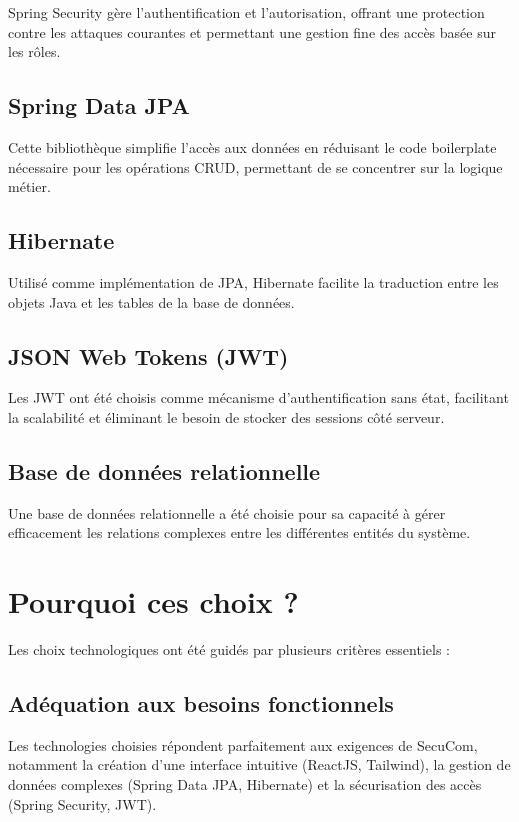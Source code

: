 \documentclass[12pt,a4paper]{report}
\begin{document}
Spring Security gère l'authentification et l'autorisation, offrant une protection contre les attaques courantes et permettant une gestion fine des accès basée sur les rôles.

\subsection{Spring Data JPA}

Cette bibliothèque simplifie l'accès aux données en réduisant le code boilerplate nécessaire pour les opérations CRUD, permettant de se concentrer sur la logique métier.

\subsection{Hibernate}

Utilisé comme implémentation de JPA, Hibernate facilite la traduction entre les objets Java et les tables de la base de données.

\subsection{JSON Web Tokens (JWT)}

Les JWT ont été choisis comme mécanisme d'authentification sans état, facilitant la scalabilité et éliminant le besoin de stocker des sessions côté serveur.

\subsection{Base de données relationnelle}

Une base de données relationnelle a été choisie pour sa capacité à gérer efficacement les relations complexes entre les différentes entités du système.

\section{Pourquoi ces choix ?}

Les choix technologiques ont été guidés par plusieurs critères essentiels :

\subsection{Adéquation aux besoins fonctionnels}

Les technologies choisies répondent parfaitement aux exigences de SecuCom, notamment la création d'une interface intuitive (ReactJS, Tailwind), la gestion de données complexes (Spring Data JPA, Hibernate) et la sécurisation des accès (Spring Security, JWT).
\end{document}
